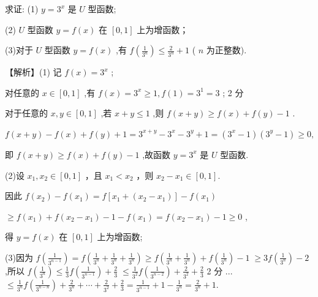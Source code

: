 \documentclass[10pt]{article}
\begin{document}
求证: (1) \(y = {3}^{x}\) 是 \(U\) 型函数;

(2) \(U\) 型函数 \(y = f\left( x\right)\) 在 \(\left\lbrack  {0,1}\right\rbrack\) 上为增函数；

(3)对于 \(U\) 型函数 \(y = f\left( x\right)\) ,有 \(f\left( \frac{1}{{3}^{n}}\right)  \leq  \frac{2}{{3}^{n}} + 1\) ( \(n\) 为正整数).

【解析】(1) 记 \(f\left( x\right)  = {3}^{x}\) ;

对任意的 \(x \in  \left\lbrack  {0,1}\right\rbrack\) ,有 \(f\left( x\right)  = {3}^{x} \geq  1,f\left( 1\right)  = {3}^{1} = 3\) ; 2 分

对于任意的 \(x,y \in  \left\lbrack  {0,1}\right\rbrack\) ,若 \(x + y \leq  1\) ,则 \(f\left( {x + y}\right)  \geq  f\left( x\right)  + f\left( y\right)  - 1\) .

\(f\left( {x + y}\right)  - f\left( x\right)  + f\left( y\right)  + 1 = {3}^{x + y} - {3}^{x} - {3}^{y} + 1 = \left( {{3}^{x} - 1}\right) \left( {{3}^{y} - 1}\right)  \geq  0,\)

即 \(f\left( {x + y}\right)  \geq  f\left( x\right)  + f\left( y\right)  - 1\) ,故函数 \(y = {3}^{x}\) 是 \(U\) 型函数.

(2)设 \({x}_{1},{x}_{2} \in  \left\lbrack  {0,1}\right\rbrack\) ，且 \({x}_{1} < {x}_{2}\) ，则 \({x}_{2} - {x}_{1} \in  \left\lbrack  {0,1}\right\rbrack  .\)

因此 \(f\left( {x}_{2}\right)  - f\left( {x}_{1}\right)  = f\left\lbrack  {{x}_{1} + \left( {{x}_{2} - {x}_{1}}\right) }\right\rbrack   - f\left( {x}_{1}\right)\)

\(\geq  f\left( {x}_{1}\right)  + f\left( {{x}_{2} - {x}_{1}}\right)  - 1 - f\left( {x}_{1}\right)  = f\left( {{x}_{2} - {x}_{1}}\right)  - 1 \geq  0\) ,

得 \(y = f\left( x\right)\) 在 \(\left\lbrack  {0,1}\right\rbrack\) 上为增函数;

(3)因为 \(f\left( \frac{1}{{3}^{n - 1}}\right)  = f\left( {\frac{1}{{3}^{n}} + \frac{1}{{3}^{n}} + \frac{1}{{3}^{n}}}\right)  \geq  f\left( {\frac{1}{{3}^{n}} + \frac{1}{{3}^{n}}}\right)  + f\left( \frac{1}{{3}^{n}}\right)  - 1 \; \geq  {3f}\left( \frac{1}{{3}^{n}}\right)  - 2\) ,所以 \(f\left( \frac{1}{{3}^{n}}\right)  \leq  \frac{1}{3}f\left( \frac{1}{{3}^{n - 1}}\right)  + \frac{2}{3} \; \leq  \frac{1}{{3}^{2}}f\left( \frac{1}{{3}^{n - 2}}\right)  + \frac{2}{{3}^{2}} + \frac{2}{3}\) 2 分 ... \(\leq  \frac{1}{{3}^{n}}f\left( \frac{1}{{3}^{n - n}}\right)  + \frac{2}{{3}^{n}} + \cdots  + \frac{2}{{3}^{2}} + \frac{2}{3} = \frac{1}{{3}^{n - 1}} + 1 - \frac{1}{{3}^{n}} = \frac{2}{{3}^{n}} + 1.\)
\end{document}
